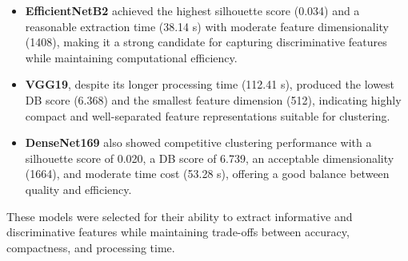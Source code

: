 \begin{itemize}
    \item \textbf{EfficientNetB2} achieved the highest silhouette score (0.034) and a reasonable extraction time (38.14 s) with moderate feature dimensionality (1408), making it a strong candidate for capturing discriminative features while maintaining computational efficiency.

    \item \textbf{VGG19}, despite its longer processing time (112.41 s), produced the lowest DB score (6.368) and the smallest feature dimension (512), indicating highly compact and well-separated feature representations suitable for clustering.

    \item \textbf{DenseNet169} also showed competitive clustering performance with a silhouette score of 0.020, a DB score of 6.739, an acceptable dimensionality (1664), and moderate time cost (53.28 s), offering a good balance between quality and efficiency.
\end{itemize}

These models were selected for their ability to extract informative and discriminative features while maintaining trade-offs between accuracy, compactness, and processing time.



